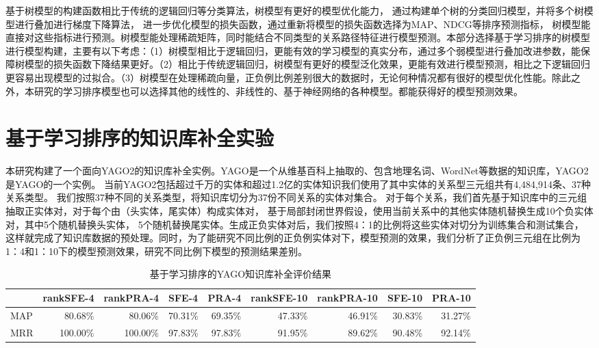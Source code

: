 基于树模型的构建函数相比于传统的逻辑回归等分类算法，树模型有更好的模型优化能力，
通过构建单个树的分类回归模型，并将多个树模型进行叠加进行梯度下降算法，
进一步优化模型的损失函数，通过重新将模型的损失函数选择为MAP、NDCG等排序预测指标，
树模型能直接对这些指标进行预测。树模型能处理稀疏矩阵，同时能结合不同类型的关系路径特征进行模型预测。本部分选择基于学习排序的树模型进行模型构建，主要有以下考虑：（1）树模型相比于逻辑回归，更能有效的学习模型的真实分布，通过多个弱模型进行叠加改进参数，能保障树模型的损失函数下降结果更好。（2）相比于传统逻辑回归，树模型有更好的模型泛化效果，更能有效进行模型预测，相比之下逻辑回归更容易出现模型的过拟合。（3）树模型在处理稀疏向量，正负例比例差别很大的数据时，无论何种情况都有很好的模型优化性能。除此之外，本研究的学习排序模型也可以选择其他的线性的、非线性的、基于神经网络的各种模型。都能获得好的模型预测效果。

\section{基于学习排序的知识库补全实验}
\label{cha:exp-relational}

本研究构建了一个面向YAGO2的知识库补全实例。YAGO是一个从维基百科上抽取的、包含地理名词、WordNet等数据的知识库，YAGO2是YAGO的一个实例。
当前YAGO2包括超过千万的实体和超过1.2亿的实体知识我们使用了其中实体的关系型三元组共有4,484,914条、37种关系类型。
我们按照37种不同的关系类型，将知识库切分为37份不同关系的实体对集合。
对于每个关系，我们首先基于知识库中的三元组抽取正实体对，对于每个由（头实体，尾实体）构成实体对，
基于局部封闭世界假设，使用当前关系中的其他实体随机替换生成10个负实体对，其中5个随机替换头实体，
5个随机替换尾实体。生成正负实体对后，我们按照4：1的比例将这些实体对切分为训练集合和测试集合，
这样就完成了知识库数据的预处理。同时，为了能研究不同比例的正负例实体对下，模型预测的效果，我们分析了正负例三元组在比例为1：4和1：10下的模型预测效果，研究不同比例下模型的预测结果差别。

\begin{table}[htbp]
  \centering
  \caption{基于学习排序的YAGO知识库补全评价结果}
    \begin{tabular}{|l|r|r|r|r|r|r|r|r|}
    \hline
          & \multicolumn{1}{l|}{rankSFE-4} & \multicolumn{1}{l|}{rankPRA-4} & \multicolumn{1}{l|}{SFE-4} & \multicolumn{1}{l|}{PRA-4} & \multicolumn{1}{l|}{rankSFE-10} & \multicolumn{1}{l|}{rankPRA-10} & \multicolumn{1}{l|}{SFE-10} & \multicolumn{1}{l|}{PRA-10} \bigstrut\\
    \hline
    MAP   & 80.68\% & 80.06\% & 70.31\% & 69.35\% & 47.33\% & 46.91\% & 30.83\% & 31.27\% \bigstrut\\
    \hline
    MRR   & 100.00\% & 100.00\% & 97.83\% & 97.83\% & 91.95\% & 89.62\% & 90.48\% & 92.14\% \bigstrut\\
    \hline
    \end{tabular}%
  \label{tab:kbc-yago-rank}%
\end{table}%

